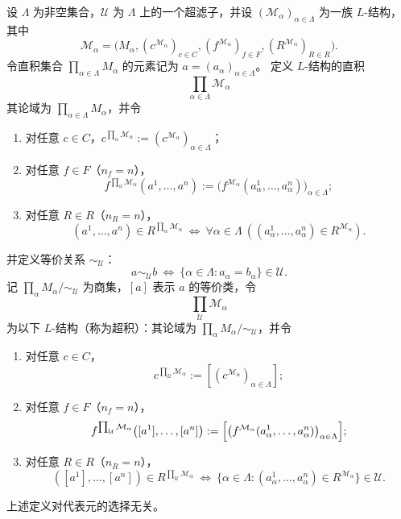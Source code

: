 \documentclass[lang=cn,a4paper,newtx,section]{elegantbook}
\begin{document}
\begin{definition}[超积]
\label{ultraproduct}
设 $\Lambda$ 为非空集合，$\mathcal U$ 为 $\Lambda$ 上的一个超滤子，并设 $(\mathcal M_{\alpha})_{\alpha\in\Lambda}$ 为一族 $L$-结构，其中
\[
  \mathcal M_{\alpha}=\bigl(M_{\alpha},(c^{\mathcal M_{\alpha}})_{c\in C},(f^{\mathcal M_{\alpha}})_{f\in F},(R^{\mathcal M_{\alpha}})_{R\in R}\bigr).
\]
令直积集合 $\prod_{\alpha\in\Lambda}M_{\alpha}$ 的元素记为 $a=(a_{\alpha})_{\alpha\in\Lambda}$。
定义 $L$-结构的直积
\[
\prod_{\alpha\in\Lambda}\mathcal M_{\alpha}
\]
其论域为 $\prod_{\alpha\in\Lambda}M_{\alpha}$，并令
\begin{enumerate}
\item 对任意 $c\in C$，$c^{\prod_{\alpha}\mathcal M_{\alpha}}:=(c^{\mathcal M_{\alpha}})_{\alpha\in\Lambda}$；
\item 对任意 $f\in F$（$n_f=n$），
\[
f^{\prod_{\alpha}\mathcal M_{\alpha}}(a^{1},\dots,a^{n}):=\bigl(f^{\mathcal M_{\alpha}}(a^{1}_{\alpha},\dots,a^{n}_{\alpha})\bigr)_{\alpha\in\Lambda};
\]
\item 对任意 $R\in R$（$n_R=n$），
\[
(a^{1},\dots,a^{n})\in R^{\prod_{\alpha}\mathcal M_{\alpha}}\ \Longleftrightarrow\ \forall\alpha\in\Lambda\ ((a^{1}_{\alpha},\dots,a^{n}_{\alpha})\in R^{\mathcal M_{\alpha}}).
\]
\end{enumerate}
并定义等价关系 $\sim_{\mathcal U}$：
\[
a\sim_{\mathcal U} b\ \Longleftrightarrow\ \{\alpha\in\Lambda: a_{\alpha}=b_{\alpha}\}\in\mathcal U.
\]
记 $\prod_{\alpha}M_{\alpha}/\!\sim_{\mathcal U}$ 为商集，$[a]$ 表示 $a$ 的等价类，令
\[
\prod_{\mathcal U}\mathcal M_{\alpha}
\]
为以下 $L$-结构（称为超积）：其论域为 $\prod_{\alpha}M_{\alpha}/\!\sim_{\mathcal U}$，并令
\begin{enumerate}
\item 对任意 $c\in C$，
\[
c^{\prod_{\mathcal U}\mathcal M_{\alpha}}:=[(c^{\mathcal M_{\alpha}})_{\alpha\in\Lambda}];
\]
\item 对任意 $f\in F$（$n_f=n$），
\[
f^{\prod_{\mathcal U}\mathcal M_{\alpha}}\bigl([a^{1}],\dots,[a^{n}]\bigr):=\Bigl[\bigl(f^{\mathcal M_{\alpha}}(a^{1}_{\alpha},\dots,a^{n}_{\alpha})\bigr)_{\alpha\in\Lambda}\Bigr];
\]
\item 对任意 $R\in R$（$n_R=n$），
\[
([a^{1}],\dots,[a^{n}])\in R^{\prod_{\mathcal U}\mathcal M_{\alpha}}\ \Longleftrightarrow\ \{\alpha\in\Lambda:(a^{1}_{\alpha},\dots,a^{n}_{\alpha})\in R^{\mathcal M_{\alpha}}\}\in\mathcal U.
\]
\end{enumerate}
上述定义对代表元的选择无关。
\end{definition}
\end{document}
